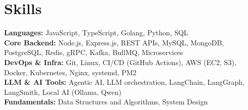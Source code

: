 \documentclass[]{resume-openfont}
\newcommand{\resumeHeading}[4]{\runsubsection{\uppercase{#1}}\descript{ | #2}\hfill\location{#3 | #4}\fakeNewLine}
\begin{document}
\sectionsep



\section{Skills}
\begin{skillList}
    \textbf{Languages:} JavaScript, TypeScript, Golang, Python, SQL \\
    \textbf{Core Backend:} Node.js, Express.js, REST APIs, MySQL, MongoDB, PostgreSQL, Redis, gRPC, Kafka, BullMQ, Microservices \\
    \textbf{DevOps \& Infra:} Git, Linux, CI/CD (GitHub Actions), AWS (EC2, S3), Docker, Kubernetes, Nginx, systemd, PM2 \\
    \textbf{LLM \& AI Tools:} Agentic AI, LLM orchestration, LangChain, LangGraph, LangSmith, Local AI (Ollama, Qwen) \\
    \textbf{Fundamentals:} Data Structures and Algorithms, System Design
\end{skillList}

\end{document}
